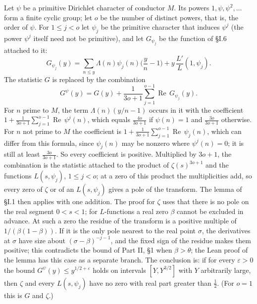 \documentclass[11pt,letterpaper]{article}
\newcommand{\re}{\operatorname{Re}}
\begin{document}
Let $\psi$ be a primitive Dirichlet character of conductor $M$. Its powers $1,\psi,\psi^2,\dots$ form a finite cyclic group; let $o$ be the number of distinct powers, that is, the order of $\psi$. For $1\le j<o$ let $\psi_j$ be the primitive character that induces $\psi^j$ (the power $\psi^j$ itself need not be primitive), and let $G_{\psi_j}$ be the function of \S I.6 attached to it:
\begin{equation}\label{D:36}
 G_{\psi_j}(y)=\sum_{n\le y}\Lambda(n)\psi_j(n)\Big(\frac yn-1\Big)+y\,\frac{L'}{L}(1,\psi_j).
\end{equation}
The statistic $G$ is replaced by the combination
\begin{equation}\label{D:37}
 G^{\psi}(y)=G(y)+\frac1{3o+1}\sum_{j=1}^{o-1}\re\,G_{\psi_j}(y).
\end{equation}
For $n$ prime to $M$, the term $\Lambda(n)(y/n-1)$ occurs in it with the coefficient $1+\frac1{3o+1}\sum_{j=1}^{o-1}\re\,\psi^j(n)$, which equals $\frac{4o}{3o+1}$ if $\psi(n)=1$ and $\frac{3o}{3o+1}$ otherwise. For $n$ not prime to $M$ the coefficient is $1+\frac1{3o+1}\sum_{j=1}^{o-1}\re\,\psi_j(n)$, which can differ from this formula, since $\psi_j(n)$ may be nonzero where $\psi^j(n)=0$; it is still at least $\frac{3o}{3o+1}$. So every coefficient is positive. Multiplied by $3o+1$, the combination is the statistic attached to the product of $\zeta(s)^{3o+1}$ and the functions $L(s,\psi_j)$, $1\le j<o$; at a zero of this product the multiplicities add, so every zero of $\zeta$ or of an $L(s,\psi_j)$ gives a pole of the transform. The lemma of \S I.1 then applies with one addition. The proof for $\zeta$ uses that there is no pole on the real segment $0<s<1$; for $L$-functions a real zero $\beta$ cannot be excluded in advance. At such a zero the residue of the transform is a positive multiple of $1/(\beta(1-\beta))$. If it is the only pole nearest to the real point $\sigma$, the derivatives at $\sigma$ have size about $(\sigma-\beta)^{-j-1}$, and the fixed sign of the residue makes them positive; this contradicts the bound of Part II, \S1 when $\beta>\theta$; the Lean proof of the lemma has this case as a separate branch. The conclusion is: if for every $\varepsilon>0$ the bound $G^\psi(y)\le y^{1/2+\varepsilon}$ holds on intervals $[Y,Y^{3/2}]$ with $Y$ arbitrarily large, then $\zeta$ and every $L(s,\psi_j)$ have no zero with real part greater than $\frac12$. (For $o=1$ this is $G$ and $\zeta$.)
\end{document}
